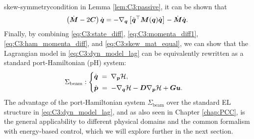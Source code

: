 skew-symmetrycondition in Lemma \ref{lem:C3:passive}, it can be shown that
%
\begin{equation}
\left( \dot{\boldsymbol{M}} - 2\boldsymbol{C} \right) \dot{\boldsymbol{q}} =  -\nabla_{\boldsymbol{q}} \left[ \dot{\boldsymbol{q}}^\top \boldsymbol{M}(\boldsymbol{q}) \dot{\boldsymbol{q}} \right] - \dot{\boldsymbol{M}}\dot{\boldsymbol{q}}. \label{eq:C3:skew_mat_equal}
\end{equation}
%
Finally, by combining \eqref{eq:C3:state_diff}, \eqref{eq:C3:momenta_diff1}, \eqref{eq:C3:ham_momenta_diff}, and \eqref{eq:C3:skew_mat_equal}, we can show that the Lagrangian model in \eqref{eq:C3:dyn_model_lag} can be equivalently rewritten as a standard port-Hamiltonian (pH) system:
\begin{align}
\Sigma_{\textrm{beam}}: 
\begin{cases}
\dot{\boldsymbol{q}} \;=\; \nabla_{\boldsymbol{p}} \mathcal{H}, \\[0.25em]
\dot{\boldsymbol{p}} \;=\; -\nabla_{\boldsymbol{q}} \mathcal{H} - \boldsymbol{D}\nabla_{\boldsymbol{p}} \mathcal{H} + \boldsymbol{Gu}.
\end{cases}
\label{eq:C3:model_ph}
\end{align}
%
The advantage of the port-Hamiltonian system $\Sigma_\textrm{beam}$ over the standard EL structure in \eqref{eq:C3:dyn_model_lag}, and as also seen in Chapter \ref{chap:PCC}, is the general applicability to different physical domains and the common formalism with energy-based control, which we will explore further in the next section. 

